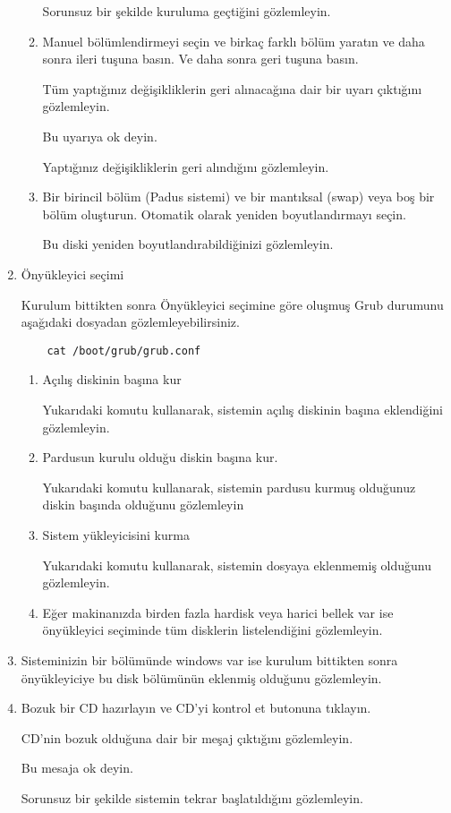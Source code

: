\documentclass[a4paper,10pt]{article}
\begin{document}
\begin{enumerate}
\begin{enumerate}
	Sorunsuz bir şekilde kuruluma geçtiğini gözlemleyin.
	\item Manuel bölümlendirmeyi seçin ve birkaç farklı bölüm yaratın ve daha sonra ileri tuşuna basın. Ve daha sonra geri tuşuna basın.

	Tüm yaptığınız değişikliklerin geri alınacağına dair bir uyarı çıktığını gözlemleyin. 

	Bu uyarıya ok deyin. 
		
	Yaptığınız değişikliklerin geri alındığını gözlemleyin.
	 
        \item Bir birincil bölüm (Padus sistemi) ve bir mantıksal (swap) veya boş bir bölüm oluşturun. Otomatik olarak yeniden boyutlandırmayı seçin.

	Bu diski yeniden boyutlandırabildiğinizi gözlemleyin.
    \end{enumerate}
\item Önyükleyici seçimi

Kurulum bittikten sonra Önyükleyici seçimine göre oluşmuş Grub durumunu aşağıdaki dosyadan gözlemleyebilirsiniz. 
   \begin{verbatim}
    cat /boot/grub/grub.conf 
   \end{verbatim}


   \begin{enumerate}
     \item Açılış diskinin başına kur

	Yukarıdaki komutu kullanarak, sistemin açılış diskinin başına eklendiğini gözlemleyin.
    \item Pardusun kurulu olduğu diskin başına kur.

	Yukarıdaki komutu kullanarak, sistemin pardusu kurmuş olduğunuz diskin başında olduğunu gözlemleyin
    \item Sistem yükleyicisini kurma

	Yukarıdaki komutu kullanarak, sistemin dosyaya eklenmemiş olduğunu gözlemleyin.

    \item Eğer makinanızda birden fazla hardisk veya harici bellek var ise önyükleyici seçiminde tüm disklerin listelendiğini gözlemleyin.
      \end{enumerate}
 \item Sisteminizin bir bölümünde windows var ise kurulum bittikten sonra önyükleyiciye bu disk bölümünün eklenmiş olduğunu gözlemleyin.
\item Bozuk bir CD hazırlayın ve CD'yi kontrol et butonuna tıklayın.

CD'nin bozuk olduğuna dair bir meşaj çıktığını gözlemleyin.

Bu mesaja ok deyin.

Sorunsuz bir şekilde sistemin tekrar başlatıldığını gözlemleyin.

\end{enumerate}
\end{document}
